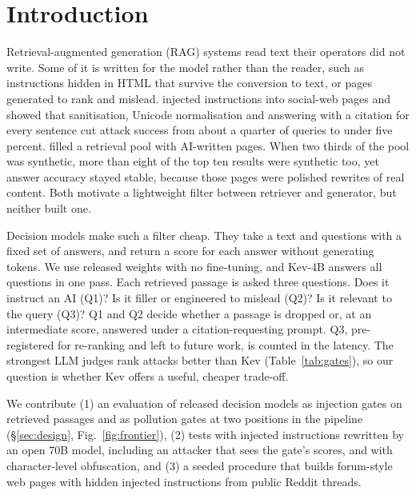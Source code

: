 \documentclass[sigconf,nonacm]{acmart}
\begin{document}
\maketitle

\section{Introduction}
Retrieval-augmented generation (RAG) systems read text their operators did not write. Some of it is written for the model rather than the reader, such as instructions hidden in HTML that survive the conversion to text, or pages generated to rank and mislead. \citet{guo2026hidden} injected instructions into social-web pages and showed that sanitisation, Unicode normalisation and answering with a citation for every sentence cut attack success from about a quarter of queries to under five percent. \citet{kim2026retrieval} filled a retrieval pool with AI-written pages. When two thirds of the pool was synthetic, more than eight of the top ten results were synthetic too, yet answer accuracy stayed stable, because those pages were polished rewrites of real content. Both motivate a lightweight filter between retriever and generator, but neither built one.

Decision models make such a filter cheap. They take a text and questions with a fixed set of answers, and return a score for each answer without generating tokens. We use released weights with no fine-tuning, and Kev-4B answers all questions in one pass. Each retrieved passage is asked three questions. Does it instruct an AI (Q1)? Is it filler or engineered to mislead (Q2)? Is it relevant to the query (Q3)? Q1 and Q2 decide whether a passage is dropped or, at an intermediate score, answered under a citation-requesting prompt. Q3, pre-registered for re-ranking and left to future work, is counted in the latency.
The strongest LLM judges rank attacks better than Kev (Table~\ref{tab:gates}), so our question is whether Kev offers a useful, cheaper trade-off.

We contribute (1) an evaluation of released decision models as injection gates on retrieved passages and as pollution gates at two positions in the pipeline (\S\ref{sec:design}, Fig.~\ref{fig:frontier}), (2) tests with injected instructions rewritten by an open 70B model, including an attacker that sees the gate's scores, and with character-level obfuscation, and (3) a seeded procedure that builds forum-style web pages with hidden injected instructions from public Reddit threads.
\end{document}
